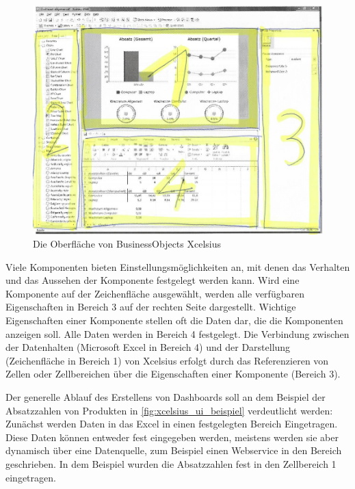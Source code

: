 \begin{onehalfspacing}
\begin{figure}[h]
\centering
\setlength{\unitlength}{1mm}
\includegraphics[width=15cm]{images/Xcelsius_UI_Aufbau.jpg}
\caption{Die Oberfläche von BusinessObjects Xcelsius\label{fig:xcelsius_ui_aufbau}}
\end{figure} 

Viele Komponenten bieten Einstellungsmöglichkeiten an, mit denen das Verhalten und das Aussehen der Komponente festgelegt werden kann. Wird eine Komponente auf der Zeichenfläche ausgewählt, werden alle verfügbaren Eigenschaften in Bereich 3 auf der rechten Seite dargestellt. Wichtige Eigenschaften einer Komponente stellen oft die Daten dar, die die Komponenten anzeigen soll. Alle Daten werden in Bereich 4 festgelegt. Die Verbindung zwischen der Datenhalten (Microsoft Excel in Bereich 4) und der Darstellung (Zeichenfläche in Bereich 1) von \gls{Xcelsius} erfolgt durch das Referenzieren von Zellen oder Zellbereichen über die Eigenschaften einer Komponente (Bereich 3).

Der generelle Ablauf des Erstellens von Dashboards soll an dem Beispiel der Absatzzahlen von Produkten in \vref{fig:xcelsius_ui_beispiel} verdeutlicht werden: Zunächst werden Daten in das Excel in einen festgelegten Bereich Eingetragen. Diese Daten können entweder fest eingegeben werden, meistens werden sie aber dynamisch über eine Datenquelle, zum Beispiel einen Webservice in den Bereich geschrieben. In dem Beispiel wurden die Absatzzahlen fest in den Zellbereich 1 eingetragen. 


\end{onehalfspacing}
